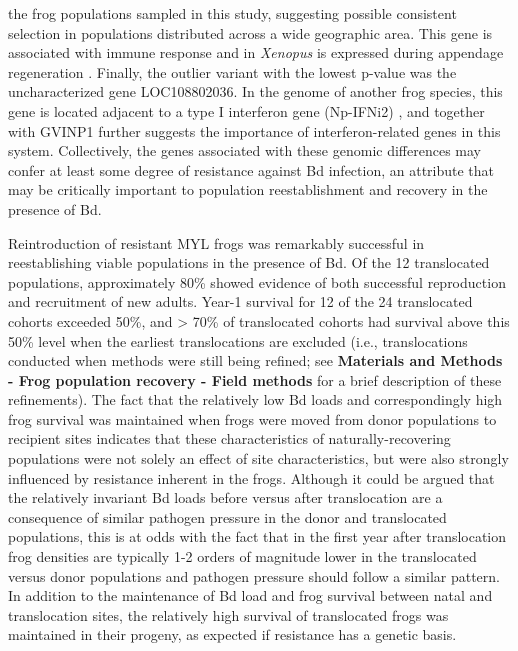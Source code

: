\documentclass[9pt,twocolumn,twoside,lineno]{pnas-new}
\begin{document}
the frog populations sampled in this study, suggesting possible
consistent selection in populations distributed across a wide geographic
area. This gene is associated with immune response and in \emph{Xenopus}
is expressed during appendage regeneration \citep{fukazawa2009}.
Finally, the outlier variant with the lowest p-value was the
uncharacterized gene LOC108802036. In the genome of another frog
species, this gene is located adjacent to a type I interferon gene
(Np-IFNi2) \citep{gan2018}, and together with GVINP1 further suggests
the importance of interferon-related genes in this system. Collectively,
the genes associated with these genomic differences may confer at least
some degree of resistance against Bd infection, an attribute that may be
critically important to population reestablishment and recovery in the
presence of Bd.

Reintroduction of resistant MYL frogs was remarkably successful in
reestablishing viable populations in the presence of Bd. Of the 12
translocated populations, approximately 80\% showed evidence of both
successful reproduction and recruitment of new adults. Year-1 survival
for 12 of the 24 translocated cohorts exceeded 50\%, and \textgreater{}
70\% of translocated cohorts had survival above this 50\% level when the
earliest translocations are excluded (i.e., translocations conducted
when methods were still being refined; see \textbf{Materials and Methods
- Frog population recovery - Field methods} for a brief description of
these refinements). The fact that the relatively low Bd loads and
correspondingly high frog survival was maintained when frogs were moved
from donor populations to recipient sites indicates that these
characteristics of naturally-recovering populations were not solely an
effect of site characteristics, but were also strongly influenced by
resistance inherent in the frogs. Although it could be argued that the
relatively invariant Bd loads before versus after translocation are a
consequence of similar pathogen pressure in the donor and translocated
populations, this is at odds with the fact that in the first year after
translocation frog densities are typically 1-2 orders of magnitude lower
in the translocated versus donor populations and pathogen pressure
should follow a similar pattern. In addition to the maintenance of Bd
load and frog survival between natal and translocation sites, the
relatively high survival of translocated frogs was maintained in their
progeny, as expected if resistance has a genetic basis.
\end{document}
